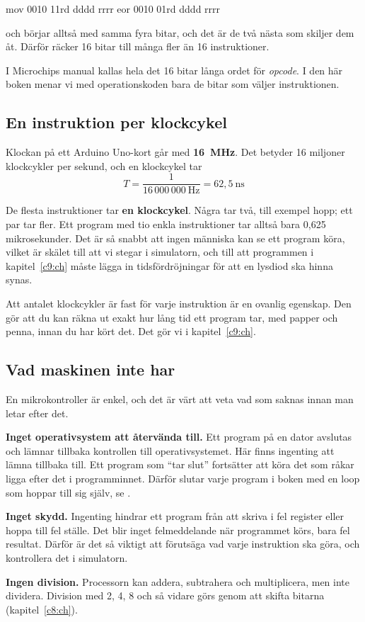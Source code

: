 \begin{textdrawing}
mov  0010 11rd dddd rrrr
eor  0010 01rd dddd rrrr
\end{textdrawing}

 och  börjar alltså med samma fyra bitar, och det är de två nästa som skiljer
dem åt. Därför räcker 16 bitar till många fler än 16 instruktioner.

I Microchips manual kallas hela det 16 bitar långa ordet för \emph{opcode}. I den här boken menar
vi med operationskoden bara de bitar som väljer instruktionen.

\subsection{En instruktion per klockcykel}
\label{c7:a7}
Klockan på ett Arduino Uno-kort går med \textbf{16~MHz}. Det betyder 16 miljoner klockcykler per
sekund, och en klockcykel tar
\[
  T = \frac{1}{16\,000\,000\ \text{Hz}} = 62{,}5\ \text{ns}
\]

De flesta instruktioner tar \textbf{en klockcykel}. Några tar två, till exempel hopp; ett par tar
fler. Ett program med tio enkla instruktioner tar alltså bara 0,625 mikrosekunder. Det är så snabbt
att ingen människa kan se ett program köra, vilket är skälet till att vi stegar i simulatorn, och
till att programmen i kapitel~\ref{c9:ch} måste lägga in tidsfördröjningar för att en lysdiod ska
hinna synas.

Att antalet klockcykler är fast för varje instruktion är en ovanlig egenskap. Den gör att du kan
räkna ut exakt hur lång tid ett program tar, med papper och penna, innan du har kört det. Det gör
vi i kapitel~\ref{c9:ch}.

\subsection{Vad maskinen inte har}
\label{c7:a8}
En mikrokontroller är enkel, och det är värt att veta vad som saknas innan man letar efter det.

\textbf{Inget operativsystem att återvända till.} Ett program på en dator avslutas och lämnar
tillbaka kontrollen till operativsystemet. Här finns ingenting att lämna tillbaka till. Ett program
som \enquote{tar slut} fortsätter att köra det som råkar ligga efter det i programminnet. Därför
slutar varje program i boken med en loop som hoppar till sig själv, se .

\textbf{Inget skydd.} Ingenting hindrar ett program från att skriva i fel register eller hoppa till
fel ställe. Det blir inget felmeddelande när programmet körs, bara fel resultat. Därför är det så
viktigt att förutsäga vad varje instruktion ska göra, och kontrollera det i simulatorn.

\textbf{Ingen division.} Processorn kan addera, subtrahera och multiplicera, men inte dividera.
Division med 2, 4, 8 och så vidare görs genom att skifta bitarna (kapitel~\ref{c8:ch}).
